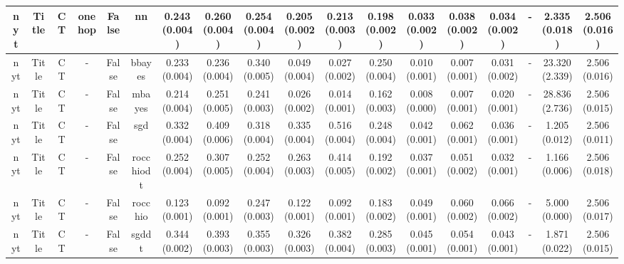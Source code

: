 \documentclass{article}
\begin{document}
{\begin{landscape}
\begin{table}[!h]
{\begin{tabular}{@{}cccccccccccccccccc@{}}
\midrule nyt & Title & CT & onehop & False & nn & 0.243 (0.004) & 0.260 (0.004) & 0.254 (0.004) & 0.205 (0.002) & 0.213 (0.003) & 0.198 (0.002) & 0.033 (0.002) & 0.038 (0.002) & 0.034 (0.002) &- & 2.335 (0.018) & 2.506 (0.016)\\
\midrule nyt & Title & CT & - & False & bbayes & 0.233 (0.004) & 0.236 (0.004) & 0.340 (0.005) & 0.049 (0.004) & 0.027 (0.002) & 0.250 (0.004) & 0.010 (0.001) & 0.007 (0.001) & 0.031 (0.002) &- & 23.320 (2.339) & 2.506 (0.016)\\
\midrule nyt & Title & CT & - & False & mbayes & 0.214 (0.004) & 0.251 (0.005) & 0.241 (0.003) & 0.026 (0.002) & 0.014 (0.001) & 0.162 (0.003) & 0.008 (0.000) & 0.007 (0.001) & 0.020 (0.001) &- & 28.836 (2.736) & 2.506 (0.015)\\
\midrule nyt & Title & CT & - & False & sgd & 0.332 (0.004) & 0.409 (0.006) & 0.318 (0.004) & 0.335 (0.004) & 0.516 (0.004) & 0.248 (0.004) & 0.042 (0.001) & 0.062 (0.001) & 0.036 (0.001) &- & 1.205 (0.012) & 2.506 (0.011)\\
\midrule nyt & Title & CT & - & False & rocchiodt & 0.252 (0.004) & 0.307 (0.005) & 0.252 (0.004) & 0.263 (0.003) & 0.414 (0.005) & 0.192 (0.002) & 0.037 (0.001) & 0.051 (0.002) & 0.032 (0.001) &- & 1.166 (0.006) & 2.506 (0.018)\\
\midrule nyt & Title & CT & - & False & rocchio & 0.123 (0.001) & 0.092 (0.001) & 0.247 (0.003) & 0.122 (0.001) & 0.092 (0.001) & 0.183 (0.002) & 0.049 (0.001) & 0.060 (0.002) & 0.066 (0.002) &- & 5.000 (0.000) & 2.506 (0.017)\\
\midrule nyt & Title & CT & - & False & sgddt & 0.344 (0.002) & 0.393 (0.003) & 0.355 (0.003) & 0.326 (0.003) & 0.382 (0.004) & 0.285 (0.003) & 0.045 (0.001) & 0.054 (0.001) & 0.043 (0.001) &- & 1.871 (0.022) & 2.506 (0.015)\\
                          \end{tabular}}
                          \end{table}


\end{landscape}}
\end{document}
